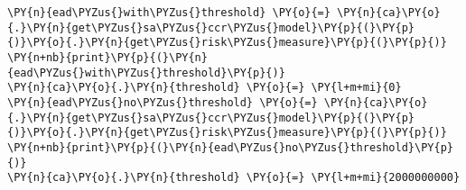     \begin{tcolorbox}[breakable, size=fbox, boxrule=1pt, pad at break*=1mm,colback=cellbackground, colframe=cellborder]
\begin{Verbatim}[commandchars=\\\{\}]
\PY{n}{ead\PYZus{}with\PYZus{}threshold} \PY{o}{=} \PY{n}{ca}\PY{o}{.}\PY{n}{get\PYZus{}sa\PYZus{}ccr\PYZus{}model}\PY{p}{(}\PY{p}{)}\PY{o}{.}\PY{n}{get\PYZus{}risk\PYZus{}measure}\PY{p}{(}\PY{p}{)}
\PY{n+nb}{print}\PY{p}{(}\PY{n}{ead\PYZus{}with\PYZus{}threshold}\PY{p}{)}
\PY{n}{ca}\PY{o}{.}\PY{n}{threshold} \PY{o}{=} \PY{l+m+mi}{0}
\PY{n}{ead\PYZus{}no\PYZus{}threshold} \PY{o}{=} \PY{n}{ca}\PY{o}{.}\PY{n}{get\PYZus{}sa\PYZus{}ccr\PYZus{}model}\PY{p}{(}\PY{p}{)}\PY{o}{.}\PY{n}{get\PYZus{}risk\PYZus{}measure}\PY{p}{(}\PY{p}{)}
\PY{n+nb}{print}\PY{p}{(}\PY{n}{ead\PYZus{}no\PYZus{}threshold}\PY{p}{)}
\PY{n}{ca}\PY{o}{.}\PY{n}{threshold} \PY{o}{=} \PY{l+m+mi}{2000000000}
\end{Verbatim}
\end{tcolorbox}

